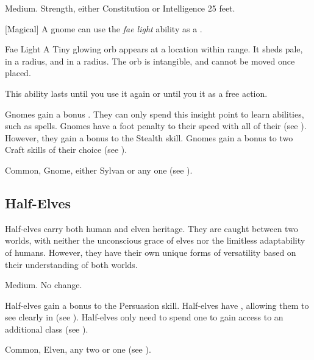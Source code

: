          Medium.
          Strength, either  Constitution or  Intelligence
         25 feet.
        \begin{raggeditemize}
            [Magical] A gnome can use the \textit{fae light} ability as a .
                \begin{freeability}{Fae Light}
                    A Tiny glowing orb appears at a location within \rngmed range.
                    It sheds pale,  in a \areasmall radius, and  in a \areamed radius.
                    The orb is intangible, and cannot be moved once placed.

                    This ability lasts until you use it again or until you  it as a free action.
                \end{freeability}
             Gnomes gain a bonus .
                They can only spend this insight point to learn  abilities, such as spells.
             Gnomes have a  foot penalty to their speed with all of their  (see ).
                However, they gain a  bonus to the Stealth skill.
             Gnomes gain a  bonus to two Craft skills of their choice (see ).
        \end{raggeditemize}
         Common, Gnome, either Sylvan or any one  (see ).

    \subsection{Half-Elves}\label{Half-Elves}

        Half-elves carry both human and elven heritage.
        They are caught between two worlds, with neither the unconscious grace of elves nor the limitless adaptability of humans.
        However, they have their own unique forms of versatility based on their understanding of both worlds.

         Medium.
         No change.
        \begin{raggeditemize}
             Half-elves gain a  bonus to the Persuasion skill.
             Half-elves have , allowing them to see clearly in  (see ).
             Half-elves only need to spend one  to gain access to an additional class (see ).
        \end{raggeditemize}
         Common, Elven, any two  or one  (see ).


